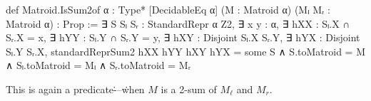 
\begin{leancode}
def Matroid.IsSum2of {α : Type*} [DecidableEq α]
    (M : Matroid α) (Mₗ Mᵣ : Matroid α) :
    Prop :=
  ∃ S Sₗ Sᵣ : StandardRepr α Z2,
  ∃ x y : α,
  ∃ hXX : Sₗ.X ∩ Sᵣ.X = {x},
  ∃ hYY : Sₗ.Y ∩ Sᵣ.Y = {y},
  ∃ hXY : Disjoint Sₗ.X Sᵣ.Y,
  ∃ hYX : Disjoint Sₗ.Y Sᵣ.X,
  standardReprSum2 hXX hYY hXY hYX = some S
  ∧ S.toMatroid = M
  ∧ Sₗ.toMatroid = Mₗ
  ∧ Sᵣ.toMatroid = Mᵣ
\end{leancode}
This is again a predicate\.---\.when $M$ is
a 2-sum of $M_{\ell}$ and $M_{r}$.
